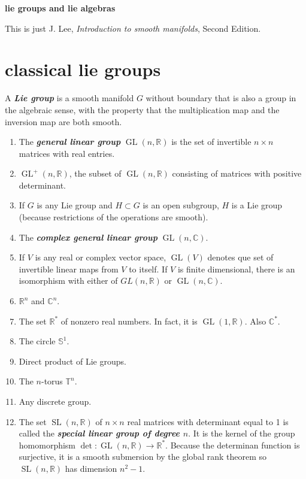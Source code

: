 \documentclass{article}
\makeatletter
\renewcommand\tableofcontents{%
	\@starttoc{toc}%
}
\numberwithin{equation}{section}
\newcommand{\R}{\mathbb{R}}
\newcommand{\C}{\mathbb{C}}
\newcommand{\T}{\mathbb{T}}
\renewcommand{\S}{\mathbb{S}}
\renewcommand{\T}{\mathbb{T}}
\DeclareMathOperator{\GL}{GL}
\DeclareMathOperator{\SL}{SL}
\makeatother
\begin{document}
{\LARGE\bfseries lie groups and lie algebras}
\thispagestyle{fancy}
\vspace{.5cm}

This is just J. Lee, \textit{Introduction to smooth manifolds}, Second Edition.

\tableofcontents
\section{classical lie groups}
\begin{defn}
	A \textbf{\textit{Lie group}} is a smooth manifold $G$ without boundary that is also a group in the algebraic sense, with the property that the multiplication map and the inversion map are both smooth.
\end{defn}
\begin{example}\leavevmode
	\begin{enumerate}
		\item The \textbf{\textit{general linear group}} $\GL(n,\R)$ is the set of invertible $n\times n$ matrices with real entries.
		\item $\GL^+(n,\R)$, the subset of $\GL(n,\R)$ consisting of matrices with positive determinant.
		\item If $G$ is any Lie group and $H\subset G$ is an open subgroup, $H$ is a Lie group (because restrictions of the operations are smooth).
		\item The \textbf{\textit{complex general linear group}} $\GL(n,\C)$.
		\item If $V$ is any real or complex vector space, $\GL(V)$ denotes que set of invertible linear maps from $V$ to itself. If $V$ is finite dimensional, there is an isomorphism with either of $GL(n,\R)$ or $\GL(n,\C)$.
		\item $\R^n$ and $\C^n$.
		\item The set $\R^*$ of nonzero real numbers. In fact, it is $\GL(1,\R)$. Also $\C^*$.
		\item The circle $\S^1$.
		\item Direct product of Lie groups.
		\item The $n$-torus $\T^n$.
		\item Any discrete group.
		\item The set $\SL(n,\R)$ of $n\times n$ real matrices with determinant equal to 1 is called the \textbf{\textit{special linear group of degree $n$}}. It is the kernel of the group homomorphism $\det:\GL(n,\R)\to\R^*$. Because the determinan function is surjective, it is a smooth submersion by the global rank theorem so $\SL(n,\R)$ has dimension $n^2-1$.

\end{enumerate}
\end{example}
\end{document}
